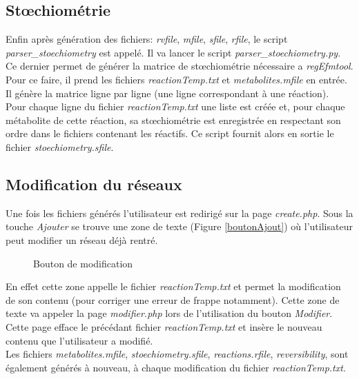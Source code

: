 \subsection{Stœchiométrie}
Enfin après génération des fichiers: \emph{rvfile}, \emph{mfile}, \emph{sfile}, \emph{rfile}, le script \emph{parser\_stoechiometry} est appelé. Il va lancer le script \emph{parser\_stoechiometry.py}. Ce dernier permet de générer la matrice de stœchiométrie nécessaire a \emph{regEfmtool}. Pour ce faire, il prend les fichiers \emph{reactionTemp.txt} et \emph{metabolites.mfile} en entrée. Il génère la matrice ligne par ligne (une ligne correspondant à une réaction). \\
Pour chaque ligne du fichier \emph{reactionTemp.txt} une liste est créée et, pour chaque métabolite de cette réaction, sa stœchiométrie est enregistrée en respectant son ordre dans le fichiers contenant les réactifs. Ce script fournit alors en sortie le fichier \emph{stoechiometry.sfile}.

\subsection{Modification du réseaux}
Une fois les fichiers générés l'utilisateur est redirigé sur la page \emph{create.php}.
Sous la touche \emph{Ajouter} se trouve une zone de texte (Figure \ref{boutonAjout}) où l'utilisateur peut modifier un réseau déjà rentré.

\begin{figure}[!ht]
    \begin{center}
        \caption{Bouton de modification}
          \label{boutonModif}
      \end{center}   
\end{figure}

En effet cette zone appelle le fichier \emph{reactionTemp.txt} et permet la modification de son contenu (pour corriger une erreur de frappe notamment). Cette zone de texte va appeler la page \emph{modifier.php} lors de l'utilisation du bouton \emph{Modifier}.\\
 Cette page efface le précédant fichier \emph{reactionTemp.txt} et insère le nouveau contenu que l'utilisateur a modifié. \\
 Les fichiers \emph{metabolites.mfile}, \emph{stoechiometry.sfile}, \emph{reactions.rfile}, \emph{reversibility}, sont également générés à nouveau, à chaque modification du fichier \emph{reactionTemp.txt}.
 
